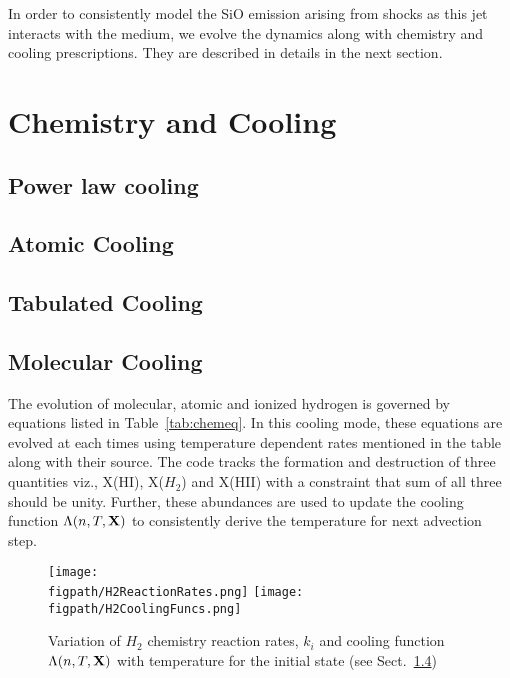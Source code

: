 \documentclass[useAMS,usenatbib,letters]{mn2e}
\newcommand{\figpath}{PFIGS/}
\begin{document}
%

In order to consistently model the SiO emission arising from shocks as
this jet interacts with the medium, we evolve the dynamics along with
chemistry and cooling prescriptions. They are described in details in
the next section.






 

\section{Chemistry and Cooling}
\label{sec:chem}
\subsection{Power law cooling}
\subsection{Atomic Cooling}
\subsection{Tabulated Cooling}


\subsection{Molecular Cooling}
\label{ssec:molcool}
The evolution of molecular, atomic and ionized hydrogen is governed by
equations listed in Table~\ref{tab:chemeq}. In this cooling mode,
these equations are evolved at each times using temperature dependent
rates mentioned in the table along with their source. The code tracks
the formation and destruction of three quantities viz., X(HI), X($H_{2}$)
and X(HII) with a constraint that sum of all three should be unity.
Further, these abundances are used to update the cooling
function $\Lambda(n,T,{\bf{X}})$ to consistently derive the
temperature for next advection step.


\begin{figure*}
 \texttt{[image: \\figpath/H2ReactionRates.png]}
 \texttt{[image: \\figpath/H2CoolingFuncs.png]}
 \caption{Variation of $H_2$ chemistry reaction rates, $k_{i}$ and cooling
   function $\Lambda(n,T,{\bf{X}})$ with temperature for the initial
   state (see Sect.~\ref{ssec:molcool})}
\label{fig:tempvar}
\end{figure*}
\end{document}
